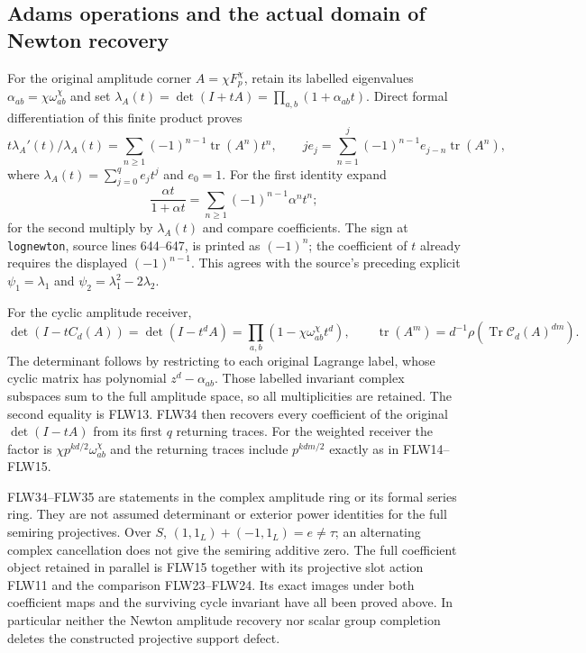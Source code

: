 \subsection{Adams operations and the actual domain of Newton recovery}

For the original amplitude corner $A=\chi F_p^\chi$, retain its
labelled eigenvalues $\alpha_{ab}=\chi\omega_{ab}^\chi$ and set
$\lambda_A(t)=\det(I+tA)=\prod_{a,b}(1+\alpha_{ab}t)$.
Direct formal differentiation of this finite product proves
\[
 t\lambda_A'(t)/\lambda_A(t)
   =\sum_{n\ge1}(-1)^{n-1}\operatorname{tr}(A^n)t^n,
 \qquad
 j e_j=\sum_{n=1}^j(-1)^{n-1}e_{j-n}\operatorname{tr}(A^n),
 \tag{FLW34}
\]
where $\lambda_A(t)=\sum_{j=0}^q e_jt^j$ and $e_0=1$.
For the first identity expand
\[
\frac{\alpha t}{1+\alpha t}=\sum_{n\ge1}(-1)^{n-1}\alpha^nt^n;
\]
for the second multiply by $\lambda_A(t)$ and compare coefficients.
The sign at \texttt{lognewton}, source lines 644--647, is printed
as $(-1)^n$; the coefficient of $t$ already requires the displayed
$(-1)^{n-1}$. This agrees with the source's preceding explicit
$\psi_1=\lambda_1$ and $\psi_2=\lambda_1^2-2\lambda_2$.

For the cyclic amplitude receiver,
\[
 \det(I-tC_d(A))=\det(I-t^dA)
            =\prod_{a,b}(1-\chi\omega_{ab}^{\chi}t^d),
 \qquad
 \operatorname{tr}(A^m)=d^{-1}\rho
                       (\operatorname{Tr}\mathcal C_d(A)^{dm}).
 \tag{FLW35}
\]
The determinant follows by restricting to each original Lagrange
label, whose cyclic matrix has polynomial $z^d-\alpha_{ab}$.
Those labelled invariant complex subspaces sum to the full amplitude
space, so all multiplicities are retained. The second equality is
FLW13. FLW34 then recovers every coefficient of the original
$\det(I-tA)$ from its first $q$ returning traces. For the weighted
receiver the factor is $\chi p^{kd/2}\omega_{ab}^\chi$ and the
returning traces include $p^{kdm/2}$ exactly as in FLW14--FLW15.

FLW34--FLW35 are statements in the complex amplitude ring or its
formal series ring. They are not assumed determinant or exterior
power identities for the full semiring projectives. Over $S$,
$(1,1_L)+(-1,1_L)=e\ne\tau$; an alternating complex cancellation
does not give the semiring additive zero. The full coefficient
object retained in parallel is FLW15 together with its projective
slot action FLW11 and the comparison FLW23--FLW24. Its exact images
under both coefficient maps and the surviving cycle invariant have
all been proved above. In particular neither the Newton amplitude
recovery nor scalar group completion deletes the constructed
projective support defect.
